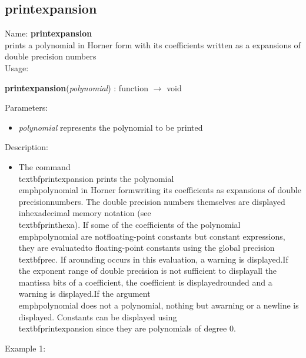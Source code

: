 \subsection{printexpansion}
\label{labprintexpansion}
\noindent Name: \textbf{printexpansion}\\
prints a polynomial in Horner form with its coefficients written as a expansions of double precision numbers\\
\noindent Usage: 
\begin{center}
\textbf{printexpansion}(\emph{polynomial}) : \textsf{function} $\rightarrow$ \textsf{void}\\
\end{center}
Parameters: 
\begin{itemize}
\item \emph{polynomial} represents the polynomial to be printed
\end{itemize}
\noindent Description: \begin{itemize}

\item The command \\textbf{printexpansion} prints the polynomial \\emph{polynomial} in Horner form\n   writing its coefficients as expansions of double precision\n   numbers. The double precision numbers themselves are displayed in\n   hexadecimal memory notation (see \\textbf{printhexa}). \n    \n   If some of the coefficients of the polynomial \\emph{polynomial} are not\n   floating-point constants but constant expressions, they are evaluated\n   to floating-point constants using the global precision \\textbf{prec}.  If a\n   rounding occurs in this evaluation, a warning is displayed.\n    \n   If the exponent range of double precision is not sufficient to display\n   all the mantissa bits of a coefficient, the coefficient is displayed\n   rounded and a warning is displayed.\n    \n   If the argument \\emph{polynomial} does not a polynomial, nothing but a\n   warning or a newline is displayed. Constants can be displayed using\n   \\textbf{printexpansion} since they are polynomials of degree $0$.\n\end{itemize}
\noindent Example 1: 
\begin{center}\begin{minipage}{15cm}\begin{Verbatim}[frame=single]
\end{Verbatim}
\end{minipage}\end{center}
